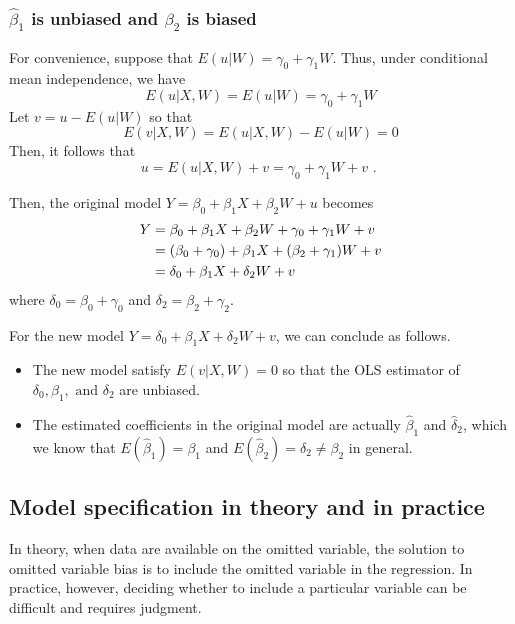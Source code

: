 \documentclass[a4paper,11pt]{article}
\begin{document}
\subsubsection*{\(\hat{\beta}_1\) is unbiased and \(\hat{\beta}_2\) is biased}
\label{sec:orgdb8f97f}

For convenience, suppose that \(E(u|W) = \gamma_0 + \gamma_1 W\). Thus,
under conditional mean independence, we have
\[ E(u|X,W) = E(u|W) = \gamma_0 + \gamma_1 W \]
Let \(v = u - E(u|W)\) so that
\[E(v|X, W) = E(u|X,W) - E(u|W) = 0 \]
Then, it follows that
\[ u = E(u|X,W) + v = \gamma_0 + \gamma_1 W + v \text{ . } \]

Then, the original model \(Y = \beta_0 + \beta_1 X + \beta_2 W + u\)
becomes
\begin{equation}
\begin{split}
Y &= \beta_0 + \beta_1 X + \beta_2 W + \gamma_0 + \gamma_1 W + v \notag \\
&= (\beta_0 + \gamma_0) + \beta_1 X + (\beta_2 + \gamma_1) W + v \notag \\
&= \delta_0 + \beta_1 X + \delta_2 W + v
\end{split}
\end{equation}
where \(\delta_0 = \beta_0 + \gamma_0\) and \(\delta_2 = \beta_2 +
\gamma_2\).

For the new model \(Y = \delta_0 + \beta_1 X + \delta_2 W + v\), we can
conclude as follows.
\begin{itemize}
\item The new model satisfy \(E(v|X,W) = 0\) so that the OLS estimator of
\(\delta_0, \beta_1, \text{ and } \delta_2\) are unbiased.
\item The estimated coefficients in the original model are actually
\(\hat{\beta}_1\) and \(\hat{\delta}_2\), which we know that
\(E(\hat{\beta}_1) = \beta_1\) and \(E(\hat{\beta}_2) = \delta_2 \neq
  \beta_2\) in general.
\end{itemize}

\subsection{Model specification in theory and in practice}
\label{sec:orgde2fce2}

In theory, when data are available on the omitted variable, the
solution to omitted variable bias is to include the omitted variable
in the regression. In practice, however, deciding whether to include a
particular variable can be difficult and requires judgment.
\end{document}
